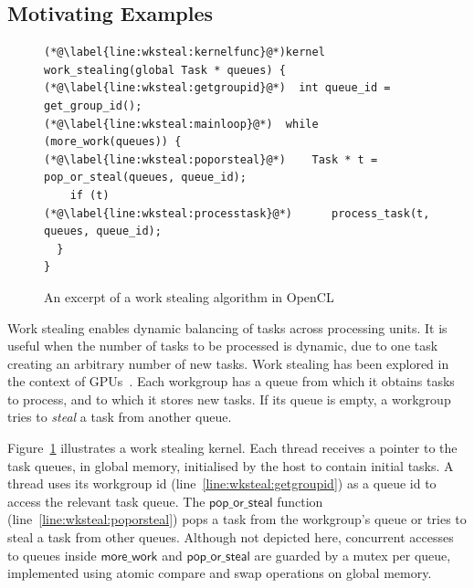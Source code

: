 \documentclass[sigconf]{acmart}
\newcommand{\ADComment}[1]{\textcolor{green}{AD: #1}}
\newcommand{\myfiglong}{Figure~}
\begin{document}
\subsection{Motivating Examples}\label{sec:openclexamples}


\begin{figure}[t]



\begin{lstlisting}
(*@\label{line:wksteal:kernelfunc}@*)kernel work_stealing(global Task * queues) {
(*@\label{line:wksteal:getgroupid}@*)  int queue_id = get_group_id();
(*@\label{line:wksteal:mainloop}@*)  while (more_work(queues)) {
(*@\label{line:wksteal:poporsteal}@*)    Task * t = pop_or_steal(queues, queue_id);
    if (t)
(*@\label{line:wksteal:processtask}@*)      process_task(t, queues, queue_id);
  }
}
\end{lstlisting}
\caption{An excerpt of a work stealing algorithm in OpenCL}\label{fig:workstealing}
\end{figure}


%
Work stealing enables dynamic balancing of tasks across
processing units. It is useful when the number of tasks to be
processed is dynamic, due to one task creating an arbitrary number of
new tasks.  Work stealing has been explored in the context of
GPUs~\cite{DBLP:conf/egh/CedermanT08,TPO10}. Each workgroup has a
queue from which it obtains tasks to process, and to which
it stores new tasks. If its queue is empty, a workgroup
tries to \emph{steal} a task from another queue.

\myfiglong\ref{fig:workstealing} illustrates a work stealing
kernel. Each thread receives a pointer to the task queues, in global
memory, initialised by the host to contain initial tasks. A thread
uses its workgroup id (line~\ref{line:wksteal:getgroupid}) as a queue
id to access the relevant task queue. The $\mathsf{pop\_or\_steal}$
function (line~\ref{line:wksteal:poporsteal}) pops a task from the
workgroup's queue or tries to steal a task from other queues. Although
not depicted here, concurrent accesses to queues inside
$\mathsf{more\_work}$ and $\mathsf{pop\_or\_steal}$ are guarded by a
mutex per queue, implemented using atomic compare and swap operations
on global memory.
\end{document}
